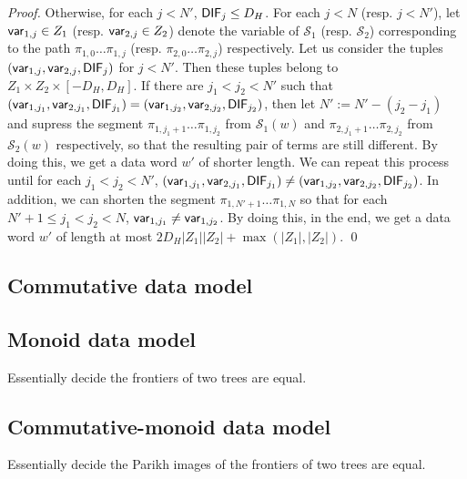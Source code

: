 \documentclass[runningheads,a4paper]{llncs}
\newcommand\Ss{\mathcal{S}}
\begin{document}
\begin{proof}
Otherwise, for each $j < N'$,  ${\sf DIF}_j \le D_H$. For each $j < N$ (resp. $j < N'$), let ${\sf var}_{1,j} \in Z_1$ (resp. ${\sf var}_{2,j} \in Z_2$) denote the variable of $\Ss_1$ (resp. $\Ss_2$) corresponding to the path $\pi_{1,0} \dots \pi_{1,j}$ (resp. $\pi_{2,0} \dots \pi_{2,j}$) respectively. Let us consider the tuples $({\sf var}_{1,j}, {\sf var}_{2,j}, {\sf DIF}_j)$ for $j < N'$. Then these tuples belong to $Z_1 \times Z_2 \times [-D_H, D_H]$. If there are $j_1 < j_2 < N'$ such that $({\sf var}_{1, j_1}, {\sf var}_{2, j_1}, {\sf DIF}_{j_1}) = ({\sf var}_{1, j_2}, {\sf var}_{2, j_2}, {\sf DIF}_{j_2})$, then let $N':= N' - (j_2 - j_1)$ and supress the segment $\pi_{1, j_1+1} \dots \pi_{1,j_2}$ from $\Ss_1(w)$ and   $\pi_{2, j_1+1} \dots \pi_{2,j_2}$ from $\Ss_2(w)$ respectively, so that the resulting pair of terms are still different. By doing this, we get a data word $w'$ of shorter length. We can repeat this process until for each $j_1 < j_2 < N'$, $({\sf var}_{1, j_1}, {\sf var}_{2, j_1}, {\sf DIF}_{j_1}) \neq ({\sf var}_{1, j_2}, {\sf var}_{2, j_2}, {\sf DIF}_{j_2})$. In addition, we can shorten the segment $\pi_{1,N'+1}\dots \pi_{1, N}$ so that for each $N'+1 \le j_1 < j_2 < N$, ${\sf var}_{1,j_1} \neq {\sf var}_{1, j_2}$. By doing this, in the end, we get a data word $w'$ of length at most $2D_H |Z_1|  |Z_2| + \max(|Z_1|, |Z_2|)$.
\qed
\end{proof}

\subsection{Commutative data model}

\subsection{Monoid data model}

Essentially decide the frontiers of two trees are equal.

\subsection{Commutative-monoid data model}

Essentially decide the Parikh images of the frontiers of two trees are equal. 
\end{document}
